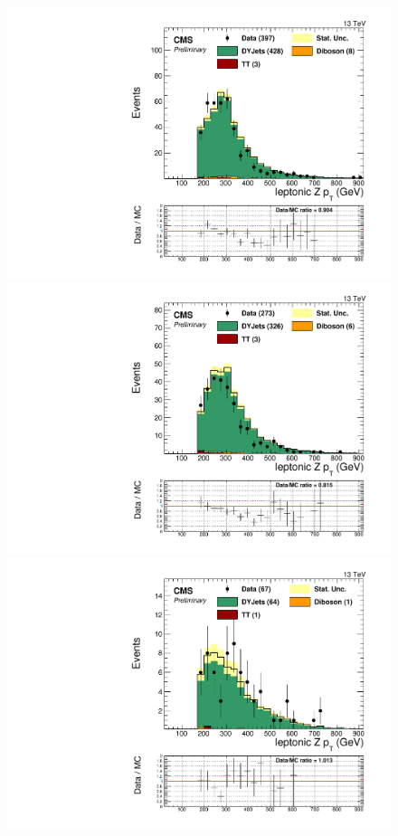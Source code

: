 \begin{figure}[h]
\begin{center}
\includegraphics[scale=0.37]{figures/control/ptZllMLP.pdf}
\includegraphics[scale=0.37]{figures/control/ptZllELP.pdf}\\[2cm]
\includegraphics[scale=0.37]{figures/control/ptZllMHP.pdf}

\end{center}
\end{figure}
